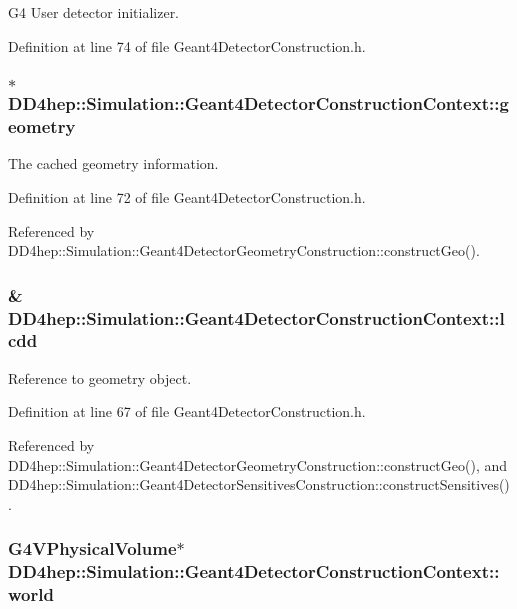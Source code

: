 G4 User detector initializer. 

Definition at line 74 of file Geant4DetectorConstruction.h.\hypertarget{class_d_d4hep_1_1_simulation_1_1_geant4_detector_construction_context_a6da3039365bc44c54314ff0d51cfc655}{
\subsubsection[{geometry}]{$\ast$ {\bf DD4hep::Simulation::Geant4DetectorConstructionContext::geometry}}}
\label{class_d_d4hep_1_1_simulation_1_1_geant4_detector_construction_context_a6da3039365bc44c54314ff0d51cfc655}


The cached geometry information. 

Definition at line 72 of file Geant4DetectorConstruction.h.

Referenced by DD4hep::Simulation::Geant4DetectorGeometryConstruction::constructGeo().\hypertarget{class_d_d4hep_1_1_simulation_1_1_geant4_detector_construction_context_a39ab0e51872f7ce4974d7f1784af251e}{
\subsubsection[{lcdd}]{\& {\bf DD4hep::Simulation::Geant4DetectorConstructionContext::lcdd}}}
\label{class_d_d4hep_1_1_simulation_1_1_geant4_detector_construction_context_a39ab0e51872f7ce4974d7f1784af251e}


Reference to geometry object. 

Definition at line 67 of file Geant4DetectorConstruction.h.

Referenced by DD4hep::Simulation::Geant4DetectorGeometryConstruction::constructGeo(), and DD4hep::Simulation::Geant4DetectorSensitivesConstruction::constructSensitives().\hypertarget{class_d_d4hep_1_1_simulation_1_1_geant4_detector_construction_context_a532857c4548770776adf8f94db5e5e56}{
\subsubsection[{world}]{\setlength{\rightskip}{0pt plus 5cm}G4VPhysicalVolume$\ast$ {\bf DD4hep::Simulation::Geant4DetectorConstructionContext::world}}}
\label{class_d_d4hep_1_1_simulation_1_1_geant4_detector_construction_context_a532857c4548770776adf8f94db5e5e56}


